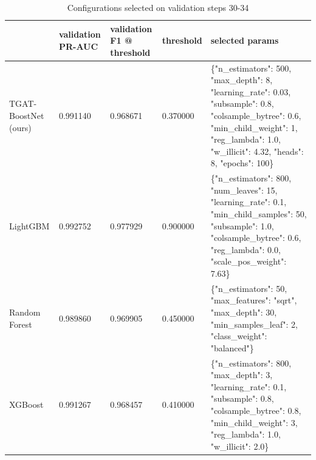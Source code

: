 \begin{table}
\caption{Configurations selected on validation steps 30-34}
\label{tab:04_selected_configs}
\begin{tabular}{lllll}
\toprule
 & validation PR-AUC & validation F1 @ threshold & threshold & selected params \\
\midrule
TGAT-BoostNet (ours) & 0.991140 & 0.968671 & 0.370000 & \{"n\_estimators": 500, "max\_depth": 8, "learning\_rate": 0.03, "subsample": 0.8, "colsample\_bytree": 0.6, "min\_child\_weight": 1, "reg\_lambda": 1.0, "w\_illicit": 4.32, "heads": 8, "epochs": 100\} \\
LightGBM & 0.992752 & 0.977929 & 0.900000 & \{"n\_estimators": 800, "num\_leaves": 15, "learning\_rate": 0.1, "min\_child\_samples": 50, "subsample": 1.0, "colsample\_bytree": 0.6, "reg\_lambda": 0.0, "scale\_pos\_weight": 7.63\} \\
Random Forest & 0.989860 & 0.969905 & 0.450000 & \{"n\_estimators": 50, "max\_features": "sqrt", "max\_depth": 30, "min\_samples\_leaf": 2, "class\_weight": "balanced"\} \\
XGBoost & 0.991267 & 0.968457 & 0.410000 & \{"n\_estimators": 800, "max\_depth": 3, "learning\_rate": 0.1, "subsample": 0.8, "colsample\_bytree": 0.8, "min\_child\_weight": 3, "reg\_lambda": 1.0, "w\_illicit": 2.0\} \\
\bottomrule
\end{tabular}
\end{table}
